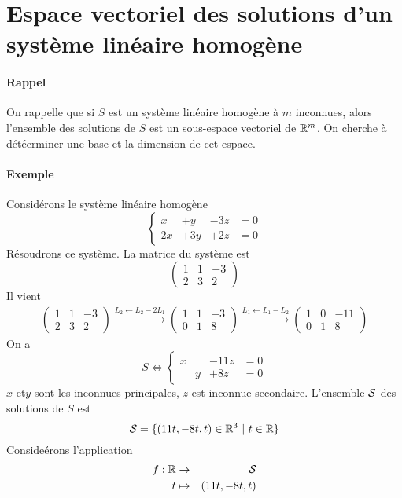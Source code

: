 %
%
\section{Espace vectoriel des solutions d'un système linéaire homogène}
%
%
\paragraph{Rappel} On rappelle que si $S$ est un système linéaire homogène à $m$ inconnues, alors l'ensemble des solutions de $S$ est un sous-espace vectoriel de $\mathbb{R}^m$. On cherche à détéerminer une base et la dimension de cet espace.

\paragraph{Exemple} Considérons le système linéaire homogène
$$\left\{\begin{array}{cccc}
   x & + y & -3z & = 0 \\
  2x & +3y & +2z & = 0
\end{array}\right. $$
Résoudrons ce système. La matrice du système est
$$\begin{pmatrix}
 1 & 1 & -3 \\
 2 & 3 & 2
\end{pmatrix}$$
Il vient
\begin{eqnarray*}
  \begin{pmatrix} 
    1 & 1 &-3 \\ 
    2 &3 & 2
  \end{pmatrix} 
  \xrightarrow{L_2 \leftarrow L_2 - 2L_1}
  \begin{pmatrix}
    1 & 1 &-3 \\ 
    0 & 1 & 8
  \end{pmatrix} 
  \xrightarrow{L_1 \leftarrow L_1 - L_2}
  \begin{pmatrix} 
    1 & 0 & -11 \\ 
    0 & 1 & 8
  \end{pmatrix}
\end{eqnarray*}
On a 
$$S \Leftrightarrow \left\{\begin{array}{cccc} x & & -11 z & = 0 \\ & y & +8 z & = 0 \end{array} \right.$$
$x$ et$y$ sont les inconnues principales, $z$ est inconnue secondaire. L'ensemble $\mathcal{S}$ des solutions de $S$ est 
$$\mathcal{S} = \{(11t, -8t, t) \in \mathbb{R}^3 ~ \vert ~ t \in \mathbb{R} \}$$
Consideérons l'application
\begin{eqnarray*}
  f: \mathbb{R} &\rightarrow& \mathcal{S} \\
  t &\mapsto & (11t, -8t, t)
\end{eqnarray*}
